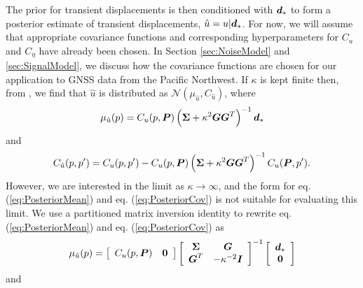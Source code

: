 \documentclass[extra,mreferee]{gji}
\begin{document}
The prior for transient displacements is then conditioned with $\mitbf{d}_*$ to form a posterior estimate of transient displacements, $\hat{u} = u | \mitbf{d}_*$. For now, we will assume that appropriate covariance functions and corresponding hyperparameters for $C_u$ and $C_\eta$ have already been chosen. In Section \ref{sec:NoiseModel} and \ref{sec:SignalModel}, we discuss how the covariance functions are chosen for our application to GNSS data from the Pacific Northwest. If $\kappa$ is kept finite then, from \citet[sec. 2.2]{Rasmussen2006}, we find that $\hat{u}$ is distributed as $\mathcal{N}(\mu_{\hat{u}},C_{\hat{u}})$, where
\begin{equation}\label{eq:PosteriorMean}
\mu_{\hat{u}}(p) = C_u(p,\mitbf{P})\left(\mitbf{\Sigma} + \kappa^2\mitbf{G}\mitbf{G}^T\right)^{-1}\mitbf{d}_*
\end{equation}    
and
\begin{equation}\label{eq:PosteriorCov}
C_{\hat{u}}(p,p') = C_u(p,p') - C_u(p,\mitbf{P})\left(\mitbf{\Sigma} + \kappa^2\mitbf{G}\mitbf{G}^T\right)^{-1}C_u(\mitbf{P},p').
\end{equation}
However, we are interested in the limit as $\kappa \to \infty$, and the form for eq. (\ref{eq:PosteriorMean}) and eq. (\ref{eq:PosteriorCov}) is not suitable for evaluating this limit. We use a partitioned matrix inversion identity \citep[sec. 2.7.4]{Press2007} to rewrite eq. (\ref{eq:PosteriorMean}) and eq. (\ref{eq:PosteriorCov}) as
 \begin{equation}\label{eq:PosteriorMean2}
\mu_{\hat{u}}(p) = \left[\begin{array}{cc}
                         C_u(p,\mitbf{P}) & \mitbf{0} \\
                         \end{array}\right]
                   \left[\begin{array}{cc}
                         \mitbf{\Sigma} & \mitbf{G} \\
                         \mitbf{G}^T  & -\kappa^{-2} \mitbf{I} \\
                         \end{array}\right]^{-1}
                   \left[\begin{array}{c}
                         \mitbf{d}_* \\
                         \mitbf{0} \\
                         \end{array}\right]
\end{equation}    
and
\end{document}

